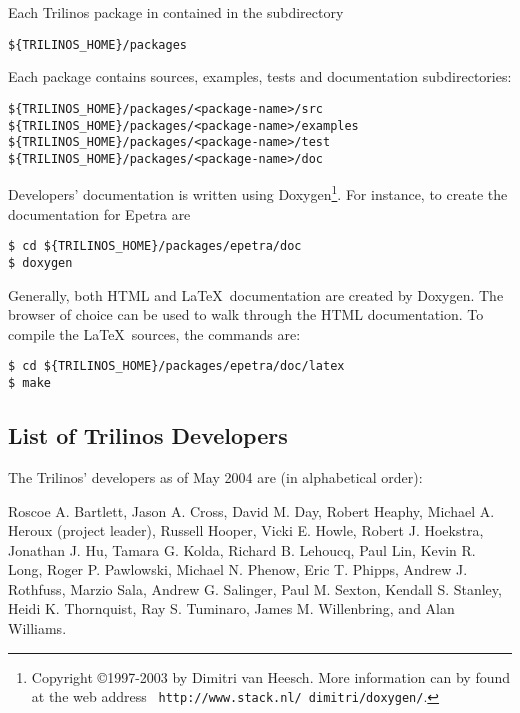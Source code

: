 Each Trilinos package in contained in the subdirectory
\begin{verbatim}
${TRILINOS_HOME}/packages
\end{verbatim}
Each package contains sources, examples, tests and documentation subdirectories:
\begin{verbatim}
${TRILINOS_HOME}/packages/<package-name>/src
${TRILINOS_HOME}/packages/<package-name>/examples
${TRILINOS_HOME}/packages/<package-name>/test
${TRILINOS_HOME}/packages/<package-name>/doc
\end{verbatim}
Developers' documentation is written using Doxygen\footnote{Copyright
  \copyright 1997-2003 by Dimitri van Heesch. More information can by
  found at the web address {\tt
    http://www.stack.nl/~dimitri/doxygen/}.}. For instance, to create
the documentation for Epetra are
\begin{verbatim}
$ cd ${TRILINOS_HOME}/packages/epetra/doc
$ doxygen
\end{verbatim}
Generally, both HTML and \LaTeX~documentation are created by Doxygen.
The browser of choice can be used to walk through the HTML
documentation.  To compile the \LaTeX~sources, the commands are:
\begin{verbatim}
$ cd ${TRILINOS_HOME}/packages/epetra/doc/latex
$ make
\end{verbatim}


\subsection{List of Trilinos Developers}
\label{sec:intro_incomplete}

The Trilinos' developers as of May 2004 are (in alphabetical order):

Roscoe A. Bartlett,
Jason A. Cross,
David M. Day,
Robert Heaphy,
Michael A. Heroux (project leader),
Russell Hooper,
Vicki E. Howle,
Robert J. Hoekstra,
Jonathan J. Hu,
Tamara G. Kolda,
Richard B. Lehoucq,
Paul Lin,
Kevin R. Long,
Roger P. Pawlowski,
Michael N. Phenow,
Eric T. Phipps,
Andrew J. Rothfuss,
Marzio Sala,
Andrew G. Salinger,
Paul M. Sexton,
Kendall S. Stanley,
Heidi K. Thornquist,
Ray S. Tuminaro,
James M. Willenbring, and
Alan Williams.

